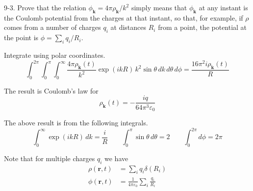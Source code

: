 \documentclass[12pt]{article}
\begin{document}
9-3.
Prove that the relation $\phi_{\mathbf k}=4\pi\rho_{\mathbf k}/k^2$
simply means that $\phi_{\mathbf k}$ at any instant is the Coulomb
potential from the charges at that instant, so that, for example,
if $\rho$ comes from a number of charges $q_i$ at distances $R_i$
from a point, the potential at the point is
$\phi=\sum_iq_i/R_i$.

\bigskip
Integrate using polar coordinates.
\begin{equation*}
\int_0^{2\pi}\int_0^\pi\int_0^\infty
\frac{4\pi\rho_{\mathbf k}(t)}{k^2}\exp(ikR)\,k^2\sin\theta\,dk\,d\theta\,d\phi
=\frac{16\pi^2i\rho_{\mathbf k}(t)}{R}
\end{equation*}

The result is Coulomb's law for
\begin{equation*}
\rho_{\mathbf k}(t)=-\frac{iq}{64\pi^3\varepsilon_0}
\end{equation*}

The above result is from the following integrals.
\begin{equation*}
\int_0^\infty\exp(ikR)\,dk=\frac{i}{R}
\qquad
\int_0^\pi\sin\theta\,d\theta=2
\qquad
\int_0^{2\pi}d\phi=2\pi
\end{equation*}

Note that for multiple charges $q_i$ we have
\begin{align*}
\rho(\mathbf r,t)&=\sum_iq_i\delta(R_i)
\\
\phi(\mathbf r,t)&=\frac{1}{4\pi\varepsilon_0}\sum_i\frac{q_i}{R_i}
\end{align*}
\end{document}
